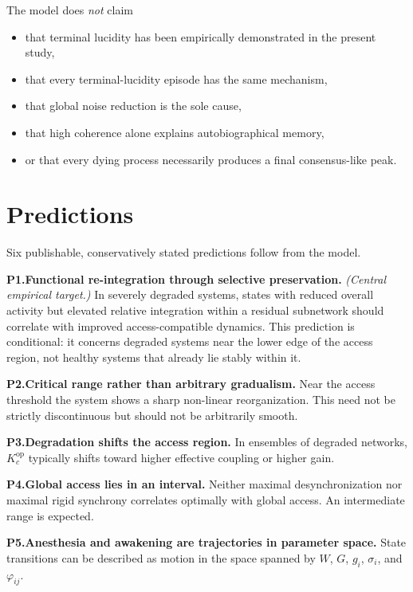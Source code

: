 \documentclass[11pt,a4paper]{article}
\theoremstyle{plain}
\theoremstyle{definition}
\theoremstyle{remark}
\newcommand{\Kcop}{K_c^{\mathrm{op}}}
\begin{document}
The model does \emph{not} claim
\begin{itemize}
\item that terminal lucidity has been empirically demonstrated in the present study,
\item that every terminal-lucidity episode has the same mechanism,
\item that global noise reduction is the sole cause,
\item that high coherence alone explains autobiographical memory,
\item or that every dying process necessarily produces a final consensus-like peak.
\end{itemize}


\section{Predictions}
\label{sec:predictions}
\label{sec:vorhersagen}

Six publishable, conservatively stated predictions follow from the model.

\medskip
\noindent\textbf{P1.\;Functional re-integration through selective preservation.} \emph{(Central empirical target.)}\quad
In severely degraded systems, states with reduced overall activity but elevated relative integration within a residual subnetwork should correlate with improved access-compatible dynamics. This prediction is conditional: it concerns degraded systems near the lower edge of the access region, not healthy systems that already lie stably within it.

\medskip
\noindent\textbf{P2.\;Critical range rather than arbitrary gradualism.}\quad
Near the access threshold the system shows a sharp non-linear reorganization. This need not be strictly discontinuous but should not be arbitrarily smooth.

\medskip
\noindent\textbf{P3.\;Degradation shifts the access region.}\quad
In ensembles of degraded networks, $\Kcop$ typically shifts toward higher effective coupling or higher gain.

\medskip
\noindent\textbf{P4.\;Global access lies in an interval.}\quad
Neither maximal desynchronization nor maximal rigid synchrony correlates optimally with global access. An intermediate range is expected.

\medskip
\noindent\textbf{P5.\;Anesthesia and awakening are trajectories in parameter space.}\quad
State transitions can be described as motion in the space spanned by $W$, $G$, $g_i$, $\sigma_i$, and $\varphi_{ij}$.
\end{document}
